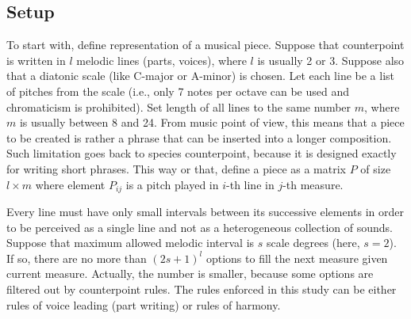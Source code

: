 \documentclass{article}
\begin{document}
\subsection{Setup}
\label{subsec:setup}

To start with, define representation of a musical piece. Suppose that counterpoint is written in $l$ melodic lines (parts, voices), where $l$ is usually 2 or 3. Suppose also that a diatonic scale (like C-major or A-minor) is chosen. Let each line be a list of pitches from the scale (i.e., only 7 notes per octave can be used and chromaticism is prohibited). Set length of all lines to the same number $m$, where $m$ is usually between 8 and 24. From music point of view, this means that a piece to be created is rather a phrase that can be inserted into a longer composition. Such limitation goes back to species counterpoint, because it is designed exactly for writing short phrases. This way or that, define a piece as a matrix $P$ of size $l \times m$ where element $P_{ij}$ is a pitch played in $i$-th line in $j$-th measure.


Every line must have only small intervals between its successive elements in order to be perceived as a single line and not as a heterogeneous collection of sounds. Suppose that maximum allowed melodic interval is $s$ scale degrees (here, $s = 2$). If so, there are no more than $(2s + 1)^l$ options to fill the next measure given current measure. Actually, the number is smaller, because some options are filtered out by counterpoint rules. The rules enforced in this study can be either rules of voice leading (part writing) or rules of harmony.
\end{document}
